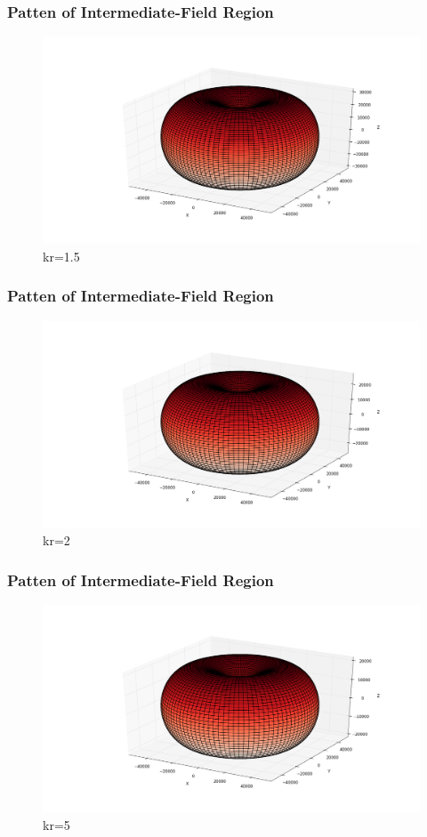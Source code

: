 \documentclass[compress=true]{beamer}
\begin{document}
\begin{frame}
  \frametitle{Patten of Intermediate-Field Region}
  \begin{figure}
    \includegraphics[height=0.7\textheight]{inter_kr_1_5_1.png}
    \caption*{\tiny{kr=1.5}}
  \end{figure}
\end{frame}
\begin{frame}
  \frametitle{Patten of Intermediate-Field Region}
  \begin{figure}
    \includegraphics[height=0.7\textheight]{inter_kr_2_1.png}
    \caption*{\tiny{kr=2}}
  \end{figure}
\end{frame}
\begin{frame}
  \frametitle{Patten of Intermediate-Field Region}
  \begin{figure}
    \includegraphics[height=0.7\textheight]{inter_kr_5_1.png}
    \caption*{\tiny{kr=5}}
  \end{figure}
\end{frame}
\end{document}
